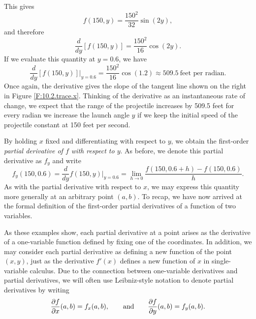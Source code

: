 This gives
$$
f(150, y) = \frac{150^2}{32}\sin(2y),
$$
and therefore
$$
\frac{d}{dy}[f(150,y)] = \frac{150^2}{16}\cos(2y).
$$
If we evaluate this quantity at $y=0.6$, we have
$$
\frac{d}{dy}[f(150,y)]|_{y=0.6} = \frac{150^2}{16}\cos(1.2) \approx 509.5
~\mbox{feet per radian}.
$$
Once again, the derivative gives the slope of the tangent line shown
on the right in Figure \ref{F:10.2.trace.x}.  Thinking of the
derivative as an instantaneous rate of change, we expect that the
range of the projectile increases by 509.5 feet for every radian we increase the launch angle
$y$ if we keep the initial speed of the projectile constant at 150 feet per second.  

By holding $x$ fixed and differentiating with respect to $y$, we
obtain the first-order {\em partial derivative of $f$ with respect to $y$}.  
As before, we denote this partial derivative as $f_y$ and write
$$
f_y(150, 0.6) = \frac{d}{dy}f(150,y)|_{y=0.6} = \lim_{h\to
  0}\frac{f(150, 0.6+h) - f(150, 0.6)}{h}.
$$
As with the partial derivative with respect to $x$, we may express this quantity more generally at an arbitrary point $(a,b)$. 
To recap, we have now arrived at the formal definition of the first-order partial derivatives of a function of two variables.

\vspace*{5pt}
\nin {}
\vspace*{5pt}



As these examples show, each partial derivative at a point arises as
the derivative of a one-variable function defined by fixing one of the
coordinates.  In addition, we may consider each partial derivative as defining a new
function of the point $(x,y)$, just as the derivative $f'(x)$ defines
a new function of $x$ in single-variable calculus.  Due to the connection between one-variable
derivatives and partial derivatives, we will often use Leibniz-style
notation to denote partial derivatives by writing
$$
\frac{\partial f}{\partial x}(a, b) = f_x(a,b),
\hspace*{20pt}
\mbox{and}
\hspace*{20pt}
\frac{\partial f}{\partial y}(a, b) = f_y(a,b).
$$

